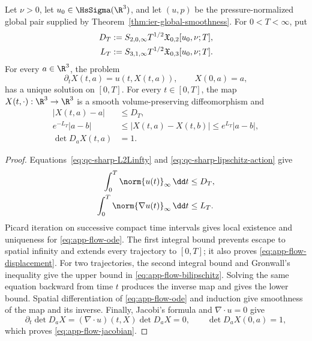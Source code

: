 \begin{theorem}
\label{thm:app-material-flow}
Let \(\nu>0\), let \(u_0\in\HsSigma(\R^3)\), and let \((u,p)\) be
the pressure-normalized global pair supplied by
Theorem~\ref{thm:ier-global-smoothness}.
For \(0<T<\infty\), put
\begin{align}
 D_T&:=S_{2,0,\infty}T^{1/2}
 \mathfrak X_{0,2}[u_0,\nu;T],\notag\\
 L_T&:=S_{3,1,\infty}T^{1/2}
 \mathfrak X_{0,3}[u_0,\nu;T].
 \label{eq:app-flow-actions}
\end{align}
For every \(a\in\R^3\), the problem
\begin{equation}
 \partial_tX(t,a)=u(t,X(t,a)),
 \qquad X(0,a)=a,
 \label{eq:app-flow-ode}
\end{equation}
has a unique solution on \([0,T]\).  For every \(t\in[0,T]\), the map
\(X(t,\cdot):\R^3\to\R^3\) is a smooth volume-preserving diffeomorphism
and
\begin{align}
 |X(t,a)-a|&\le D_T,
 \label{eq:app-flow-displacement}\\
 e^{-L_T}|a-b|
 &\le|X(t,a)-X(t,b)|
 \le e^{L_T}|a-b|,
 \label{eq:app-flow-bilipschitz}\\
 \det D_aX(t,a)&=1.
 \label{eq:app-flow-jacobian}
\end{align}
\end{theorem}

\begin{proof}
Equations~\eqref{eq:qc-sharp-L2Linfty} and
\eqref{eq:qc-sharp-lipschitz-action} give
\begin{align*}
 \int_0^T\norm{u(t)}_\infty\,\dd t&\le D_T,\\
 \int_0^T\norm{\nabla u(t)}_\infty\,\dd t&\le L_T.
\end{align*}
Picard iteration on successive compact time intervals gives local
existence and uniqueness for \eqref{eq:app-flow-ode}.  The first integral
bound prevents escape to spatial infinity and extends every trajectory to
\([0,T]\); it also proves \eqref{eq:app-flow-displacement}.  For two
trajectories, the second integral bound and Gronwall's inequality give the
upper bound in \eqref{eq:app-flow-bilipschitz}.  Solving the same equation
backward from time \(t\) produces the inverse map and gives the lower
bound.  Spatial differentiation of \eqref{eq:app-flow-ode} and induction
give smoothness of the map and its inverse.  Finally, Jacobi's formula and
\(\nabla\cdot u=0\) give
\[
 \partial_t\det D_aX
 =(\nabla\cdot u)(t,X)\det D_aX=0,
 \qquad \det D_aX(0,a)=1,
\]
which proves \eqref{eq:app-flow-jacobian}.
\end{proof}

